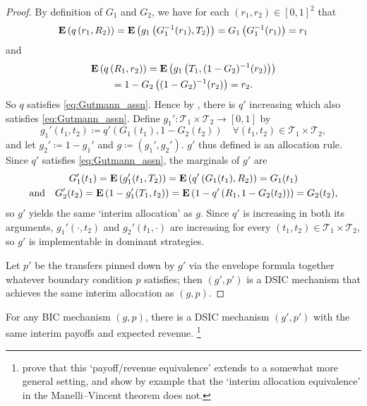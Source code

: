 \documentclass[11pt,letterpaper,reqno,oneside]{article}
\begin{document}
\begin{proof}
	By definition of $G_1$ and $G_2$, we have for each $(r_1,r_2) \in [0,1]^2$ that
	\begin{equation*}
		\mathbf{E}\left( q\left( r_1, R_2 \right) \right)
		= \mathbf{E}\left( g_1\left( G_1^{-1}(r_1), T_2 \right) \right)
		= G_1\left( G_1^{-1}(r_1) \right)
		= r_1
	\end{equation*}
	and
	\begin{multline*}
		\mathbf{E}\left( q\left( R_1, r_2 \right) \right)
		= \mathbf{E}\left( g_1\left( T_1, (1-G_2)^{-1}(r_2) \right) \right)
		\\
		= 1 - G_2\left( (1-G_2)^{-1}(r_2) \right)
		= r_2 .
	\end{multline*}
	So $q$ satisfies \eqref{eq:Gutmann_assn}. Hence by , there is $q'$ increasing which also satisfies \eqref{eq:Gutmann_assn}. Define $g_1' : \mathcal{T}_1 \times \mathcal{T}_2 \to [0,1]$ by
	\begin{equation*}
		g_1'(t_1,t_2) \coloneqq q'\left( G_1(t_1), 1-G_2(t_2) \right)
		\quad\forall (t_1,t_2) \in \mathcal{T}_1 \times \mathcal{T}_2 ,
	\end{equation*}
	and let $g_2' \coloneqq 1-g_1'$ and $g \coloneqq (g_1',g_2')$. $g'$ thus defined is an allocation rule. Since $q'$ satisfies \eqref{eq:Gutmann_assn}, the marginals of $g'$ are
	\begin{gather*}
		G_1'(t_1) 
		= \mathbf{E}\left( g_1'(t_1,T_2) \right)
		= \mathbf{E}\left( q'\left( G_1(t_1), R_2 \right) \right)
		= G_1(t_1)
		\\
		\text{and}\quad
		G_2'(t_2)
		= \mathbf{E}\left( 1 - g_1'(T_1,t_2) \right)
		= \mathbf{E}\left( 1 - q'\left( R_1, 1 - G_2(t_2) \right) \right)
		= G_2(t_2) ,
	\end{gather*}
	so $g'$ yields the same `interim allocation' as $g$. Since $q'$ is increasing in both its arguments, $g_1'(\cdot,t_2)$ and $g_2'(t_1,\cdot)$ are increasing for every $(t_1,t_2) \in \mathcal{T}_1 \times \mathcal{T}_2$, so $g'$ is implementable in dominant strategies.

	Let $p'$ be the transfers pinned down by $g'$ via the envelope formula together whatever boundary condition $p$ satisfies; then $(g',p')$ is a DSIC mechanism that achieves the same interim allocation as $(g,p)$.
\end{proof}


\begin{corollary}
	For any BIC mechanism $(g,p)$, there is a DSIC mechanism $(g',p')$ with the same interim payoffs and expected revenue.%
		\footnote{\textcite{GershkovEtAl2013} prove that this `payoff/revenue equivalence' extends to a somewhat more general setting, and show by example that the `interim allocation equivalence' in the Manelli--Vincent theorem does not.}
\end{corollary}
\end{document}
